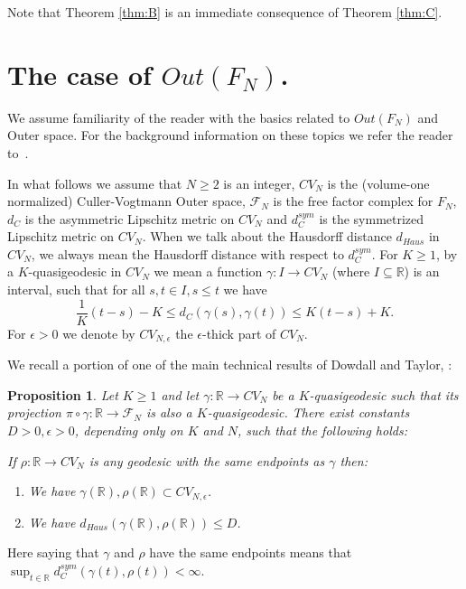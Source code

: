 \documentclass[11pt,letterpaper]{amsart}
\newtheorem{prop}[thm]{Proposition}
\theoremstyle{definition}
\theoremstyle{remark}
\begin{document}
Note that Theorem \ref{thm:B} is an immediate consequence of Theorem \ref{thm:C}.

\section{The case of $Out(F_N)$.}


We assume familiarity of the reader with the basics related to $Out(F_N)$ and Outer space. For the background information on these topics we refer the reader to~\cite{BF,BH,CV,FM}.

In what follows we assume that $N\ge 2$ is an integer, $CV_N$ is the (volume-one normalized) Culler-Vogtmann Outer space, $\mathcal F_N$ is the free factor complex for $F_N$, $d_C$ is the asymmetric Lipschitz metric on $CV_N$ and $d^{sym}_C$ is the symmetrized Lipschitz metric on $CV_N$. When we talk about the Hausdorff distance $d_{Haus}$ in $CV_N$, we always mean the Hausdorff distance with respect to $d^{sym}_C$. For $K\ge 1$, by a $K$-quasigeodesic in $CV_N$ we mean a function $\gamma:I\to CV_N$ (where $I\subseteq \mathbb R$) is an interval, such that for all $s,t\in I, s\le t$ we have
\[
 \frac{1}{K}(t-s)-K \le d_C(\gamma(s),\gamma(t))\le K(t-s)+K.
\]
For $\epsilon>0$ we denote by $CV_{N,\epsilon}$ the $\epsilon$-thick part of $CV_N$.


We recall a portion of one of the main technical results of Dowdall and Taylor, \cite[Theorem 4.1]{DT1}:
\begin{prop}\label{prop:DT}
Let $K\ge 1$ and let $\gamma:\mathbb R\to CV_N$ be a $K$-quasigeodesic such that its projection $\pi\circ \gamma: \mathbb R\to \mathcal F_N$ is also a $K$-quasigeodesic.  There exist constants $D>0,\epsilon>0$, depending only on $K$ and $N$, such that the following holds:

If $\rho:\mathbb R\to CV_N$ is any geodesic with the same endpoints as $\gamma$ then:
\begin{enumerate}
\item We have $\gamma(\mathbb R), \rho(\mathbb R)\subset CV_{N,\epsilon}$. 
\item We have $d_{Haus}(\gamma(\mathbb R), \rho(\mathbb R))\le D$.
\end{enumerate}
 
\end{prop}
Here saying that $\gamma$ and $\rho$ have the same endpoints means that $\sup_{t\in \mathbb R} d_C^{sym}(\gamma(t),\rho(t))<\infty$.
\end{document}
